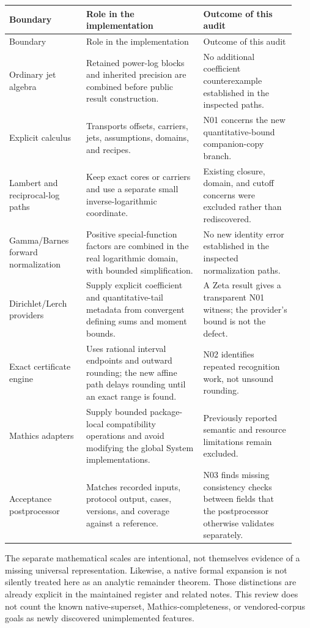 \documentclass[11pt,letterpaper]{article}
\begin{document}
\begin{longtable}{@{}p{0.25\linewidth}p{0.38\linewidth}p{0.30\linewidth}@{}}
\toprule
Boundary & Role in the implementation & Outcome of this audit \\
\midrule
\endfirsthead
\toprule
Boundary & Role in the implementation & Outcome of this audit \\
\midrule
\endhead
Ordinary jet algebra & Retained power-log blocks and inherited precision are
combined before public result construction. & No additional coefficient
counterexample established in the inspected paths. \\
Explicit calculus & Transports offsets, carriers, jets, assumptions, domains,
and recipes. & N01 concerns the new quantitative-bound companion-copy branch. \\
Lambert and reciprocal-log paths & Keep exact cores or carriers and use a
separate small inverse-logarithmic coordinate. & Existing closure, domain,
and cutoff concerns were excluded rather than rediscovered. \\
Gamma/Barnes forward normalization & Positive special-function factors are
combined in the real logarithmic domain, with bounded simplification. & No new
identity error established in the inspected normalization paths. \\
Dirichlet/Lerch providers & Supply explicit coefficient and quantitative-tail
metadata from convergent defining sums and moment bounds. & A Zeta result gives
a transparent N01 witness; the provider's bound is not the defect. \\
Exact certificate engine & Uses rational interval endpoints and outward
rounding; the new affine path delays rounding until an exact range is found. &
N02 identifies repeated recognition work, not unsound rounding. \\
Mathics adapters & Supply bounded package-local compatibility operations and
avoid modifying the global System implementations. & Previously reported
semantic and resource limitations remain excluded. \\
Acceptance postprocessor & Matches recorded inputs, protocol output, cases,
versions, and coverage against a reference. & N03 finds missing consistency
checks between fields that the postprocessor otherwise validates separately. \\
\bottomrule
\end{longtable}

The separate mathematical scales are intentional, not themselves evidence of a
missing universal representation. Likewise, a native formal expansion is not
silently treated here as an analytic remainder theorem. Those distinctions are
already explicit in the maintained register and related notes. This review does
not count the known native-superset, Mathics-completeness, or vendored-corpus goals
as newly discovered unimplemented features.\cite{status,w3,w4}
\end{document}
